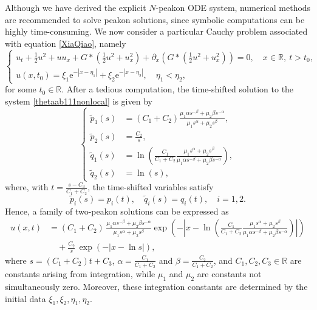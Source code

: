 \documentclass[11pt]{article}
\begin{document}
Although we have derived the explicit $N$-peakon ODE system, numerical methods are recommended to solve peakon solutions, since symbolic computations can be highly time-consuming. We now consider a particular Cauchy problem associated with equation \eqref{XiaQiao}, namely
\begin{equation}
\left\{\begin{array}{l}
u_t + \frac{1}{2} u^2 + u u_x + G \ast \left( \frac{1}{2}u^2 + u_x^2 \right) 
+ \partial_x \left( G \ast \left( \frac{1}{2} u^2 + u_x^2 \right) \right) = 0, 
\quad x\in \mathbb{R},\ t>t_0, \\
u(x, t_0)= \xi_1 \mathrm{e}^{-|x - \eta_1 |} + \xi_2 \mathrm{e}^{-|x - \eta_2 |},\quad \eta_1 < \eta_2,
\end{array}\right.
\label{thetaab111nonlocal}
\end{equation}
for some $t_0 \in \mathbb{R}$. After a tedious computation, the time-shifted solution to the system \eqref{thetaab111nonlocal} is given by
\begin{equation*}
\left\{
    \begin{aligned}
        \tilde p_1(s) & = (C_1 + C_2) \frac{\mu_1 \alpha s^{-\beta} + \mu_2 \beta s^{-\alpha}}{\mu_1 s^\alpha + \mu_2 s^\beta}, \\
        \tilde{p}_2(s) & = \frac{C_2}{s}, \\
        \tilde{q}_1(s) & = \ln\left ( \frac{C_1}{C_1 + C_2} \frac{\mu_1 s^\alpha + \mu_2 s^\beta}{\mu_1 \alpha s^{-\beta}
        + \mu_2 \beta s^{-\alpha}}\right),\\
        \tilde{q}_2(s) & = \ln(s),
    \end{aligned}
\right.
\end{equation*}
where, with $t = \frac{s-C_3}{C_1+C_2}$, the time-shifted variables satisfy
\begin{equation*}
\tilde p_i(s) = p_i(t), \quad \tilde q_i(s) = q_i(t), \quad i=1,2.
\end{equation*}
Hence, a family of two-peakon solutions can be expressed as
\begin{equation*}
    \begin{aligned}
        u(x,t) 
        &= (C_1 + C_2)\,
        \frac{\mu_1 \alpha s^{-\beta} + \mu_2 \beta s^{-\alpha}}{\mu_1 s^\alpha + \mu_2 s^\beta}
        \exp\left(-\left|x - \ln\left( \frac{C_1}{C_1 + C_2} 
        \frac{\mu_1 s^\alpha + \mu_2 s^\beta}{\mu_1 \alpha s^{-\beta} + \mu_2 \beta s^{-\alpha}}\right)\right|\right) \\
        &\quad + \frac{C_2}{s}\, \exp(-|x - \ln s|),
    \end{aligned}
\end{equation*}
where $s=(C_1+C_2)t + C_3$, $\alpha = \frac{C_1}{C_1 + C_2}$ and $\beta = \frac{C_2}{C_1 + C_2}$, 
and $C_1,C_2,C_3 \in \mathbb{R}$ are constants arising from integration, while $\mu_1$ and $\mu_2$ are  constants not simultaneously zero. Moreover, these integration constants are  determined by the initial data $\xi_1,\xi_2,\eta_1,\eta_2$.
\end{document}
